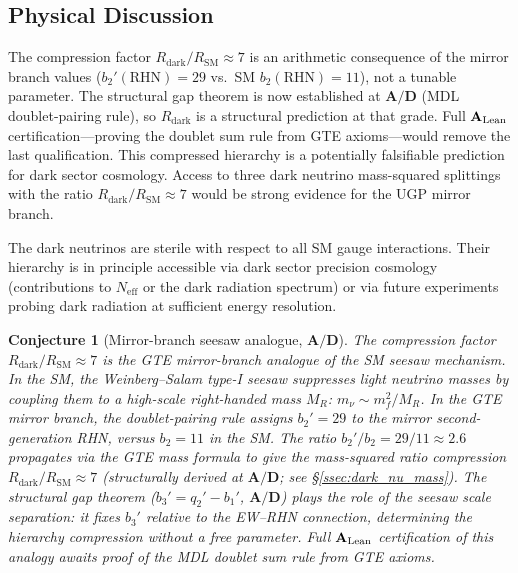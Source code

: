 \documentclass[11pt]{article}
\newtheorem{conjecture}[theorem]{Conjecture}
\newcommand{\CatAL}{\ensuremath{\textbf{A}_{\rm Lean}}}
\newcommand{\CatAD}{\textbf{A/D}}
\begin{document}
\subsection{Physical Discussion}
\label{ssec:dark_nu_physics}

The compression factor $R_\mathrm{dark}/R_\mathrm{SM} \approx 7$ is an arithmetic
consequence of the mirror branch values ($b_2'(\mathrm{RHN})=29$ vs.\ SM $b_2(\mathrm{RHN})=11$), not a tunable
parameter. The structural gap theorem is now established at $\CatAD$ (MDL
doublet-pairing rule), so $R_\mathrm{dark}$ is a structural prediction at that grade.
Full $\CatAL$ certification---proving the doublet sum rule from GTE axioms---would
remove the last qualification. This compressed hierarchy is a potentially falsifiable
prediction for dark sector cosmology. Access to three dark neutrino mass-squared splittings
with the ratio $R_\mathrm{dark}/R_\mathrm{SM} \approx 7$ would be strong evidence for the
UGP mirror branch.

The dark neutrinos are sterile with respect to all SM gauge interactions. Their hierarchy
is in principle accessible via dark sector precision cosmology (contributions to $N_\mathrm{eff}$
or the dark radiation spectrum) or via future experiments probing dark radiation at sufficient
energy resolution.

\begin{conjecture}[Mirror-branch seesaw analogue, $\CatAD$]
\label{conj:mirror_seesaw}
The compression factor $R_\mathrm{dark}/R_\mathrm{SM} \approx 7$ is the GTE mirror-branch
analogue of the SM seesaw mechanism.  In the SM, the Weinberg--Salam type-I seesaw suppresses
light neutrino masses by coupling them to a high-scale right-handed mass $M_R$: $m_\nu \sim
m_f^2/M_R$.  In the GTE mirror branch, the doublet-pairing rule assigns $b_2' = 29$
to the mirror second-generation RHN, versus $b_2 = 11$ in the SM.  The ratio $b_2'/b_2 =
29/11 \approx 2.6$ propagates via the GTE mass formula to give the mass-squared ratio
compression $R_\mathrm{dark}/R_\mathrm{SM} \approx 7$ (structurally derived at $\CatAD$;
see \S\ref{ssec:dark_nu_mass}).  The structural gap theorem ($b_3' = q_2' - b_1'$, $\CatAD$)
plays the role of the seesaw scale separation: it fixes $b_3'$ relative to the EW--RHN
connection, determining the hierarchy compression without a free parameter.
Full $\CatAL$ certification of this analogy awaits proof of the MDL doublet sum rule
from GTE axioms.
\end{conjecture}

\end{document}
